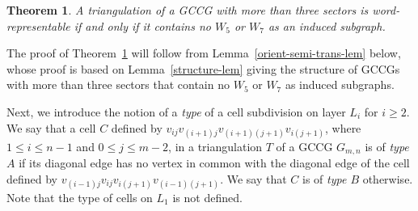 \documentclass[12pt]{article}
\newtheorem{thm}{Theorem}[section]
\numberwithin{equation}{section}
\begin{document}
\begin{thm}\label{thm-morethan-3} A triangulation of a GCCG with more than three sectors is word-representable if and only if it contains no $W_5$ or $W_7$ as an induced subgraph. \end{thm}

The proof of Theorem~\ref{thm-morethan-3} will follow from Lemma~\ref{orient-semi-trans-lem} below, whose proof is based on Lemma~\ref{structure-lem} giving the structure of GCCGs with more than three sectors that contain no $W_5$ or $W_7$ as induced subgraphs.

Next, we introduce the notion of  a {\em type} of a cell subdivision on layer $L_i$ for $i\geq 2$. We say that a cell $C$ defined by $v_{ij}v_{(i+1)j}v_{(i+1)(j+1)}v_{i(j+1)}$, where $1\leq i\leq n-1$ and $0\leq j\leq m-2$, in a triangulation $T$ of a GCCG $G_{m,n}$ is of {\em type $A$} if its diagonal edge has no vertex in common with the diagonal edge of the cell defined by $v_{(i-1)j}v_{ij}v_{i(j+1)}v_{(i-1)(j+1)}$. We say that $C$ is of {\em type $B$} otherwise. Note that the type of cells on $L_1$ is not defined.
\end{document}

